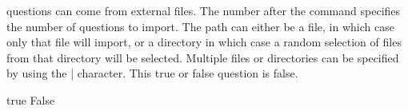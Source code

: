     \Pyxam questions can come from external files. The number after the command specifies the number of questions to import.
    The path can either be a file, in which case only that file will import, or a directory in which case a random selection
    of files from that directory will be selected. Multiple files or directories can be specified by using the | character.
    This true or false question is false.
    \begin{choices}
        \choice true
        \CorrectChoice False
    \end{choices}
